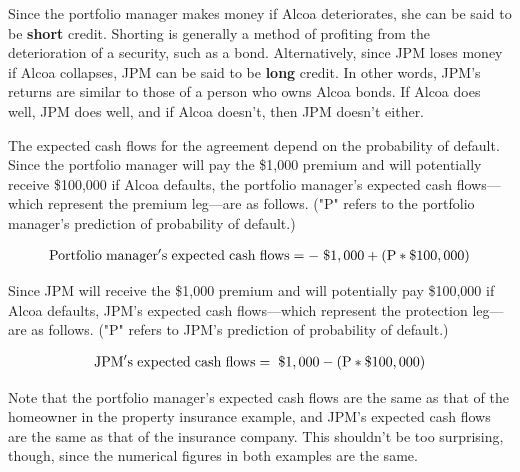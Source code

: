 \documentclass[article]{jss}
\begin{document}
Since the portfolio manager makes money if Alcoa deteriorates, she can be said to be \textbf{short} credit. Shorting is generally a method of profiting from the deterioration of a security, such as a bond. Alternatively, since JPM loses money if Alcoa collapses, JPM can be said to be \textbf{long} credit. In other words, JPM's returns are similar to those of a person who owns Alcoa bonds. If Alcoa does well, JPM does well, and if Alcoa doesn't, then JPM doesn't either.

The expected cash flows for the agreement depend on the probability of default. Since the portfolio manager will pay the \$1,000 premium and will potentially receive \$100,000 if Alcoa defaults, the portfolio manager's expected cash flows---which represent the premium leg---are as follows. ("P" refers to the portfolio manager’s prediction of probability of default.)

\begin{equation}
 \begin{aligned}
   {\rm Portfolio\hspace{3pt}manager's\hspace{3pt}expected\hspace{3pt}cash\hspace{3pt}flows = -\hspace{3pt}\$1,000 + (P * {\$100,000})}
    \end{aligned}
    \label{eqn:portfolioECF}
\end{equation}

Since JPM will receive the \$1,000 premium and will potentially pay \$100,000 if Alcoa defaults, JPM's expected cash flows---which represent the protection leg---are as follows. ("P" refers to JPM’s prediction of probability of default.)

\begin{equation}
 \begin{aligned}
   {\rm JPM's\hspace{3pt}expected\hspace{3pt}cash\hspace{3pt}flows = \hspace{3pt}\$1,000 - (P * {\$100,000})}
    \end{aligned}
    \label{eqn:jpmECF}
\end{equation}

Note that the portfolio manager's expected cash flows are the same as that of the homeowner in the property insurance example, and JPM's expected cash flows are the same as that of the insurance company. This shouldn't be too surprising, though, since the numerical figures in both examples are the same.
\end{document}
